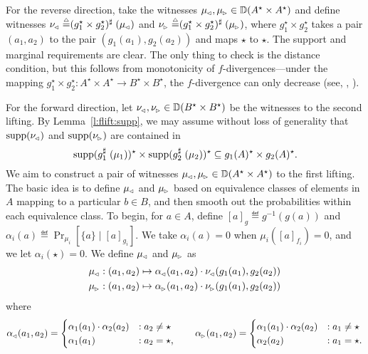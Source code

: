 \documentclass{lmcs}
\begin{document}
\proofatend
  For the reverse direction, take the witnesses $\mu\lside, \mu\rside \in \Dist(A^\star
  \times A^\star)$ and define witnesses $\nu\lside \eqdef \lift{(g_1^\star
    \times g_2^\star)}(\mu\lside)$ and $\nu\rside \eqdef \lift{(g_1^\star \times
    g_2^\star)}(\mu\rside)$, where $g_1^\star \times g_2^\star$ takes a pair $(a_1,
  a_2)$ to the pair $(g_1(a_1), g_2(a_2))$ and maps $\star$ to $\star$.  The
  support and marginal requirements are clear. The only thing to check is the
  distance condition, but this follows from monotonicity of
  $f$-divergences---under the mapping $g_1^\star \times g_2^\star : A^\star
  \times A^\star \to B^\star \times B^\star$, the $f$-divergence can only
  decrease (see, \eg, \citet{csiszar2004information}).

  For the forward direction, let $\nu\lside, \nu\rside \in \Dist(B^\star \times
  B^\star)$ be the witnesses to the second lifting. By Lemma~\ref{l:flift:supp}, we
  may assume without loss of generality that $\supp(\nu\lside)$ and
  $\supp(\nu\rside)$
  are contained in
  \[
    \supp(\lift{g_1}(\mu_1))^\star \times \supp(\lift{g_2}(\mu_2))^\star
    \subseteq g_1(A)^\star \times g_2(A)^\star .
  \]
  We aim to construct a pair
  of witnesses $\mu\lside, \mu\rside \in \Dist(A^\star \times A^\star)$ to the first
  lifting. The basic idea is to define $\mu\lside$ and $\mu\rside$ based on equivalence
  classes of elements in $A$ mapping to a particular $b \in B$, and then smooth
  out the probabilities within each equivalence class.
  To begin, for $a \in A$, define
  $[a]_{g} \eqdef g^{-1}(g(a))$ and $\alpha_i(a) \eqdef \textstyle
  \Pr_{\mu_i} [\{ a \} \mid [a]_{g_i}]$.
  We take $\alpha_i(a) = 0$ when $\mu_i([a]_{f_i}) = 0$, and we let
  $\alpha_i(\star) = 0$. We define $\mu\lside$ and $\mu\rside$ as
  \begin{align*}
    \mu\lside &: (a_1, a_2) \mapsto \alpha\lside(a_1, a_2) \cdot \nu\lside(g_1(a_1), g_2(a_2)) \\
    \mu\rside &: (a_1, a_2) \mapsto \alpha\rside(a_1, a_2) \cdot \nu\rside(g_1(a_1), g_2(a_2))
  \end{align*}
  where
  \[
    \alpha\lside(a_1, a_2) =
    \begin{cases}
      \alpha_1(a_1) \cdot \alpha_2(a_2) &: a_2 \neq \star \\
      \alpha_1(a_1) &: a_2 = \star ,
    \end{cases}
    \quad\quad
    \alpha\rside(a_1, a_2) =
    \begin{cases}
      \alpha_1(a_1) \cdot \alpha_2(a_2) &: a_1 \neq \star \\
      \alpha_2(a_2) &: a_1 = \star .
    \end{cases}
  \]
\end{document}
